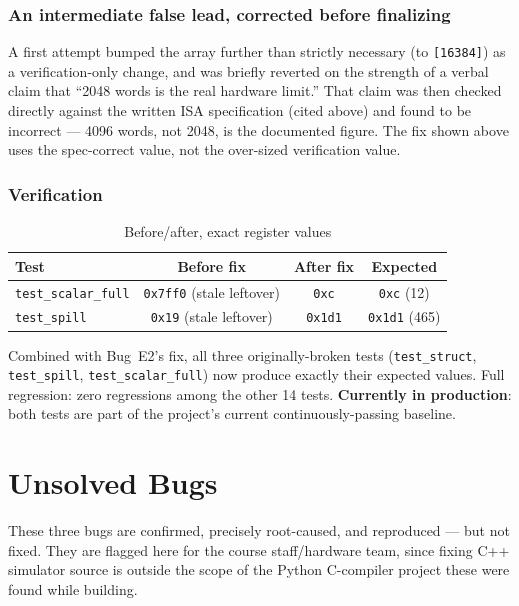 \documentclass[11pt,a4paper]{report}
\begin{document}
\subsection*{An intermediate false lead, corrected before finalizing}
A first attempt bumped the array further than strictly necessary (to \texttt{[16384]}) as a
verification-only change, and was briefly reverted on the strength of a verbal claim that
``2048 words is the real hardware limit.'' That claim was then checked directly against the
written ISA specification (cited above) and found to be incorrect --- 4096 words, not 2048,
is the documented figure. The fix shown above uses the spec-correct value, not the
over-sized verification value.

\subsection*{Verification}
\begin{table}[h]
\centering
\caption{Before/after, exact register values}
\begin{tabular}{@{}lccc@{}}
\toprule
Test & Before fix & After fix & Expected \\
\midrule
\texttt{test\_scalar\_full} & \texttt{0x7ff0} (stale leftover) & \texttt{0xc} & \texttt{0xc} (12) \\
\texttt{test\_spill} & \texttt{0x19} (stale leftover) & \texttt{0x1d1} & \texttt{0x1d1} (465) \\
\bottomrule
\end{tabular}
\end{table}
Combined with Bug~E2's fix, all three originally-broken tests (\texttt{test\_struct},
\texttt{test\_spill}, \texttt{test\_scalar\_full}) now produce exactly their expected
values. Full regression: zero regressions among the other 14 tests. \textbf{Currently in
production}: both tests are part of the project's current continuously-passing baseline.

\chapter{Unsolved Bugs}
\label{ch:unsolved}

These three bugs are confirmed, precisely root-caused, and reproduced --- but not fixed.
They are flagged here for the course staff/hardware team, since fixing C++ simulator
source is outside the scope of the Python C-compiler project these were found while
building.
\end{document}
